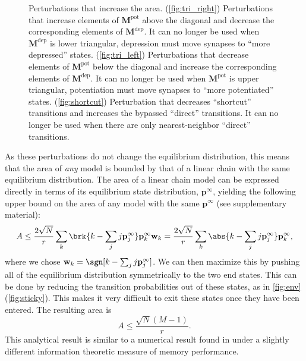 \documentclass{article} %
\newcommand{\pr}{\mathbf{p}}
\newcommand{\eq}{\pr^\infty}
\newcommand{\w}{\mathbf{w}}
\newcommand{\M}{\mathbf{M}}
\newcommand{\pot}{^{\text{pot}}}
\newcommand{\dep}{^{\text{dep}}}
\begin{document}
\begin{figure}[tbp]
 \begin{center}
 \begin{myenuma}
  \item{}\label{fig:tri_right}\hp
  \item{}\label{fig:tri_left}\hp
  \item{}\label{fig:shortcut}
 \end{myenuma}
 \end{center}
  \caption{Perturbations that increase the area.
  (\ref{fig:tri_right}) Perturbations that increase elements of $\M\pot$ above the diagonal and decrease the corresponding elements of $\M\dep$. It can no longer be used when $\M\dep$ is lower triangular, \ie depression must move synapses to ``more depressed'' states.
  (\ref{fig:tri_left}) Perturbations that decrease elements of $\M\pot$ below the diagonal and increase the corresponding elements of $\M\dep$. It can no longer be used when $\M\pot$ is upper triangular, \ie potentiation must move synapses to ``more potentiated'' states.
  (\ref{fig:shortcut}) Perturbation that decreases ``shortcut'' transitions and increases the bypassed ``direct'' transitions. It can no longer be used when there are only nearest-neighbor ``direct'' transitions.
  }\label{fig:perts}
\end{figure}

As these perturbations do not change the equilibrium distribution, this means that the area of \emph{any} model is bounded by that of a linear chain with the same equilibrium distribution.
The area of a linear chain model can be expressed directly in terms of its equilibrium state distribution, $\eq$, yielding the following upper bound on the area of any model with the same $\eq$ (see supplementary material):
%
\begin{equation}\label{eq:multistatearea}
  A \leq \frac{2\sqrt{N}}{r} \sum_k \brk{k - \sum_j j\eq_j} \eq_k \w_k
    = \frac{2\sqrt{N}}{r} \sum_k \abs{k - \sum_j j\eq_j} \eq_k ,
\end{equation}
%
where we chose $\w_k=\sgn[{k - \sum_j j\eq_j}]$.
We can then maximize this by pushing all of the equilibrium distribution symmetrically to the two end states.
This can be done by reducing the transition probabilities out of these states, as in \autoref{fig:env}(\ref{fig:sticky}). %
This makes it very difficult to exit these states once they have been entered.
The resulting area is
%
\begin{equation}\label{eq:max_area}
  A \leq \frac{\sqrt{N}(M-1)}{r}.
\end{equation}
%
This analytical result is similar to a numerical result found in \cite{Barrett2008discrete} under a slightly different information theoretic measure of memory performance.
\end{document}
